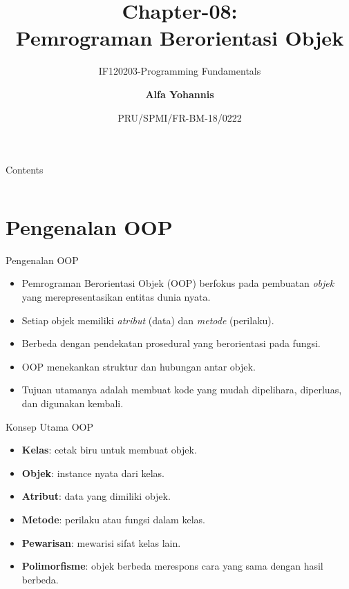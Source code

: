 \documentclass[aspectratio=169, table]{beamer}
\subtitle{IF120203-Programming Fundamentals}
\title{Chapter-08:\\\LARGE{Pemrograman Berorientasi Objek\\}
\vspace{10pt}}
\date[Serial]{\scriptsize {PRU/SPMI/FR-BM-18/0222}}
\author[Pradita]{\small{\textbf{Alfa Yohannis}}}
\begin{document}
\frame{\titlepage}

\begin{frame}[fragile]{Contents}
\vspace{15pt}
\begin{columns}[t]
\begin{column}{.4\textwidth}
\tableofcontents[sections={1-4}]
\end{column}
\begin{column}{.6\textwidth}
\tableofcontents[sections={5-7}]
\end{column}
\end{columns}
\end{frame}


\section{Pengenalan OOP}

\begin{frame}[fragile]{Pengenalan OOP}
\vspace{20pt}
\begin{itemize}
    \item Pemrograman Berorientasi Objek (OOP) berfokus pada pembuatan \emph{objek} yang merepresentasikan entitas dunia nyata.
    \item Setiap objek memiliki \emph{atribut} (data) dan \emph{metode} (perilaku).
    \item Berbeda dengan pendekatan prosedural yang berorientasi pada fungsi.
    \item OOP menekankan struktur dan hubungan antar objek.
    \item Tujuan utamanya adalah membuat kode yang mudah dipelihara, diperluas, dan digunakan kembali.
\end{itemize}
\end{frame}

\begin{frame}[fragile]{Konsep Utama OOP}
\vspace{20pt}
\begin{itemize}
    \item \textbf{Kelas}: cetak biru untuk membuat objek.  
    \item \textbf{Objek}: instance nyata dari kelas.  
    \item \textbf{Atribut}: data yang dimiliki objek.  
    \item \textbf{Metode}: perilaku atau fungsi dalam kelas.  
    \item \textbf{Pewarisan}: mewarisi sifat kelas lain.  
    \item \textbf{Polimorfisme}: objek berbeda merespons cara yang sama dengan hasil berbeda.
\end{itemize}
\end{frame}
\end{document}
